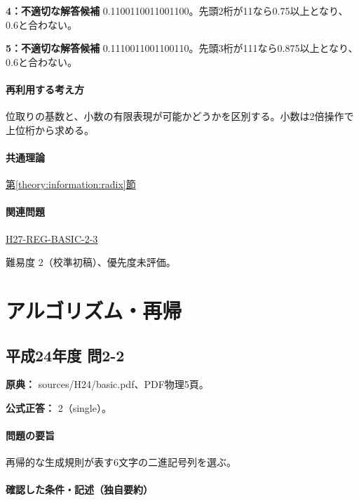 \noindent\textbf{4：不適切な解答候補} 0.1100110011001100。先頭2桁が11なら0.75以上となり、0.6と合わない。\par

\noindent\textbf{5：不適切な解答候補} 0.1110011001100110。先頭3桁が111なら0.875以上となり、0.6と合わない。\par

\paragraph{再利用する考え方} 位取りの基数と、小数の有限表現が可能かどうかを区別する。小数は2倍操作で上位桁から求める。

\paragraph{共通理論} \hyperref[theory:information:radix]{第\ref*{theory:information:radix}節}

\paragraph{関連問題} \hyperref[q:h27-reg-basic-2-3]{H27-REG-BASIC-2-3}

\par 難易度 2（校準初稿）、優先度未評価。

\section{アルゴリズム・再帰}

\subsection{平成24年度 問2-2}
\label{q:h24-reg-basic-2-2}

\noindent\textbf{原典：} sources/H24/basic.pdf、PDF物理5頁。

\textbf{公式正答：} 2（single）。

\paragraph{問題の要旨} 再帰的な生成規則が表す6文字の二進記号列を選ぶ。

\paragraph{確認した条件・記述（独自要約）}\mbox{}\par

